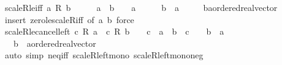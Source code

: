 \begin{isabellebody}
%
\endisadelimproof
\isanewline
{}\isamarkupfalse%
\ scaleR{\isacharunderscore}{\kern0pt}le{\isacharunderscore}{\kern0pt}{}{\isacharunderscore}{\kern0pt}iff{\isacharcolon}{\kern0pt}\ {\isachardoublequoteopen}a\ {\isacharasterisk}{\kern0pt}\isactrlsub R\ b\ {\isasymle}\ {}\ {\isasymlongleftrightarrow}\ {}\ {\isacharless}{\kern0pt}\ a\ {\isasymand}\ b\ {\isasymle}\ {}\ {\isasymor}\ a\ {\isacharless}{\kern0pt}\ {}\ {\isasymand}\ {}\ {\isasymle}\ b\ {\isasymor}\ a\ {\isacharequal}{\kern0pt}\ {}{\isachardoublequoteclose}\isanewline
\ \ \ b{\isacharcolon}{\kern0pt}{\isacharcolon}{\kern0pt}{\isachardoublequoteopen}{\isacharprime}{\kern0pt}a{\isacharcolon}{\kern0pt}{\isacharcolon}{\kern0pt}ordered{\isacharunderscore}{\kern0pt}real{\isacharunderscore}{\kern0pt}vector{\isachardoublequoteclose}\isanewline
%
\isadelimproof
\ \ %
\endisadelimproof
%
\isatagproof
{}\isamarkupfalse%
\ {\isacharparenleft}{\kern0pt}insert\ zero{\isacharunderscore}{\kern0pt}le{\isacharunderscore}{\kern0pt}scaleR{\isacharunderscore}{\kern0pt}iff\ {\isacharbrackleft}{\kern0pt}of\ {\isachardoublequoteopen}{\isacharminus}{\kern0pt}a{\isachardoublequoteclose}\ b{\isacharbrackright}{\kern0pt}{\isacharparenright}{\kern0pt}\ force%
\endisatagproof
{\isafoldproof}%
%
\isadelimproof
\isanewline
%
\endisadelimproof
\isanewline
{}\isamarkupfalse%
\ scaleR{\isacharunderscore}{\kern0pt}le{\isacharunderscore}{\kern0pt}cancel{\isacharunderscore}{\kern0pt}left{\isacharcolon}{\kern0pt}\ {\isachardoublequoteopen}c\ {\isacharasterisk}{\kern0pt}\isactrlsub R\ a\ {\isasymle}\ c\ {\isacharasterisk}{\kern0pt}\isactrlsub R\ b\ {\isasymlongleftrightarrow}\ {\isacharparenleft}{\kern0pt}{}\ {\isacharless}{\kern0pt}\ c\ {\isasymlongrightarrow}\ a\ {\isasymle}\ b{\isacharparenright}{\kern0pt}\ {\isasymand}\ {\isacharparenleft}{\kern0pt}c\ {\isacharless}{\kern0pt}\ {}\ {\isasymlongrightarrow}\ b\ {\isasymle}\ a{\isacharparenright}{\kern0pt}{\isachardoublequoteclose}\isanewline
\ \ \ b\ {\isacharcolon}{\kern0pt}{\isacharcolon}{\kern0pt}\ {\isachardoublequoteopen}{\isacharprime}{\kern0pt}a{\isacharcolon}{\kern0pt}{\isacharcolon}{\kern0pt}ordered{\isacharunderscore}{\kern0pt}real{\isacharunderscore}{\kern0pt}vector{\isachardoublequoteclose}\isanewline
%
\isadelimproof
\ \ %
\endisadelimproof
%
\isatagproof
{}\isamarkupfalse%
\ {\isacharparenleft}{\kern0pt}auto\ simp{\isacharcolon}{\kern0pt}\ neq{\isacharunderscore}{\kern0pt}iff\ scaleR{\isacharunderscore}{\kern0pt}left{\isacharunderscore}{\kern0pt}mono\ scaleR{\isacharunderscore}{\kern0pt}left{\isacharunderscore}{\kern0pt}mono{\isacharunderscore}{\kern0pt}neg\isanewline

\end{isabellebody}
